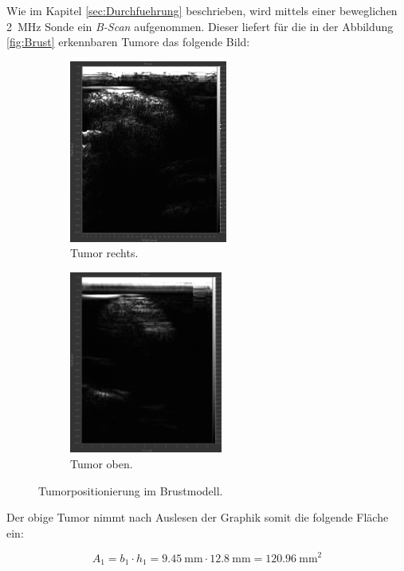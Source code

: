 \noindent Wie im Kapitel \ref{sec:Durchfuehrung} beschrieben, wird mittels einer beweglichen \qty{2}{\mega\hertz} Sonde ein 
\emph{B-Scan} aufgenommen. Dieser liefert für die in der Abbildung \ref{fig:Brust} erkennbaren Tumore das folgende Bild:

\begin{figure}
    \begin{subfigure}{0.48\textwidth}
        \centering
        \includegraphics[height=6cm]{Tumor_rechts_2.jpg}
        \caption{Tumor rechts.}
        \label{fig:TR}
    \end{subfigure}
    \hfill
    \begin{subfigure}{0.48\textwidth}
        \centering 
        \includegraphics[height=6cm]{Tumor_oben.jpg}
        \caption{Tumor oben.}
        \label{fig:TO}
    \end{subfigure}
    \caption{Tumorpositionierung im Brustmodell.}
    \label{fig:Vergleich}
\end{figure}

\noindent Der obige Tumor nimmt nach Auslesen der Graphik somit die folgende Fläche ein:

\begin{equation*}
    A_1 = b_1\cdot h_1 = \qty{9.45}{\milli\meter}\cdot \qty{12.8}{\milli\meter} = \qty{120.96}{\milli\meter\squared}
\end{equation*}

